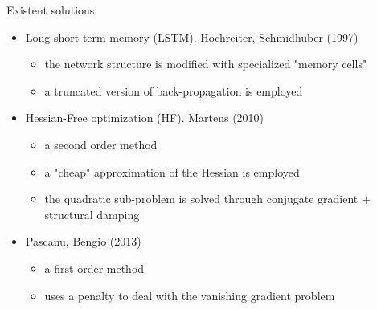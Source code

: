 \begin{frame}{Existent solutions}
	
	\pause
	\begin{itemize}
		\item Long short-term memory (LSTM). Hochreiter, Schmidhuber (1997) \cite{lstm}
			\begin{itemize}
				\item the network structure is modified with specialized "memory cells"
				\item a truncated version of back-propagation is employed
			\end{itemize}
		\pause
		\item Hessian-Free optimization (HF). Martens (2010) \cite{hessianFree}
		\begin{itemize}
			\item a second order method
			\item a "cheap" approximation of the Hessian is employed
			\item the quadratic sub-problem is solved through conjugate gradient + structural damping
		\end{itemize}
		\pause
		\item Pascanu, Bengio (2013) \cite{pascanu}
		\begin{itemize}
			\item a first order method
			\item uses a penalty to deal with the vanishing gradient problem
		\end{itemize}
	\end{itemize}
	
\end{frame}

